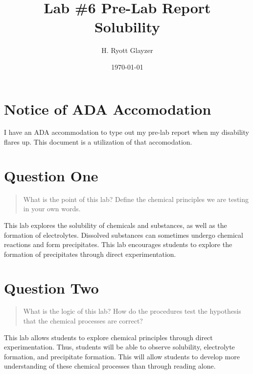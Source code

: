 \documentclass[11pt, letterpaper]{article}
\begin{document}


\title{Lab \#6 Pre-Lab Report \\ \large Solubility}
\author{H. Ryott Glayzer}
\date{\today}


\maketitle


\section*{Notice of ADA Accomodation}
I have an ADA accommodation to type out my pre-lab report when my disability flares up.
This document is a utilization of that accomodation.

\section{Question One}
\begin{quote}
    What is the point of this lab? Define the chemical principles we are testing in your own words.
\end{quote}

This lab explores the solubility of chemicals and substances,
as well as the formation of electrolytes.
Dissolved substances can sometimes undergo chemical reactions
and form precipitates. 
This lab encourages students to explore the formation of precipitates
through direct experimentation.

\section{Question Two}
\begin{quote}
    What is the logic of this lab? How do the procedures test the hypothesis that the chemical 
    processes are correct?
\end{quote}

This lab allows students to explore chemical principles through direct experimentation.
Thus, students will be able to observe solubility, electrolyte formation, and precipitate formation.
This will allow students to develop more understanding of these chemical processes
than through reading alone.
\end{document}
